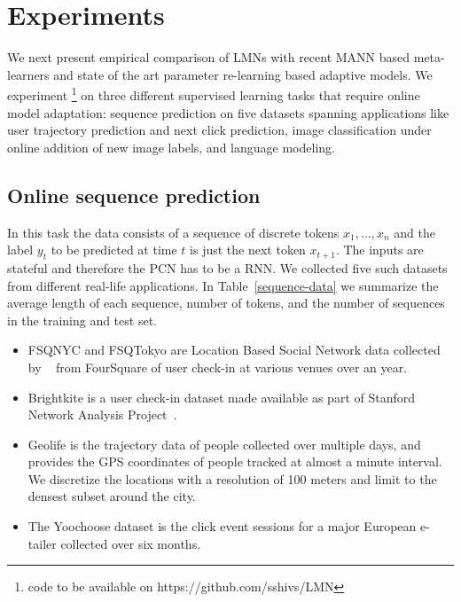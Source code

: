 \documentclass[letterpaper]{article} %
\begin{document}
\section{Experiments}
We next present empirical comparison of LMNs with recent MANN based meta-learners and state of the art parameter re-learning based adaptive models. We experiment \footnote{code to be available on https://github.com/sshivs/LMN} on three different supervised learning tasks that require online model adaptation: sequence prediction on five datasets spanning applications like user trajectory prediction and next click prediction,  image classification under online addition of new image labels, and language modeling.   
  

\subsection{Online sequence prediction}
\label{sec-expt-online}
In this task the data consists of a sequence of discrete tokens $x_1,\ldots,x_n$ and the label $y_t$ to be predicted at time $t$  is just the next token $x_{t+1}$.  The inputs are stateful and therefore the PCN has to be a RNN.
We collected five such datasets from different real-life applications. In Table~\ref{sequence-data} we summarize the average length of each sequence, number of tokens, and the number of sequences in the training and test set.  
\begin{itemize}
\item
FSQNYC and FSQTokyo are Location Based Social Network data collected by ~\cite{yang2014} from FourSquare of user check-in at various venues over an year.

\item Brightkite \cite{ChoMyLes11} is a user check-in dataset made available as part of Stanford Network Analysis Project~\cite{snapnets}.

\item
Geolife \cite{geolife09} is the trajectory data of people collected over multiple days, and provides the GPS coordinates of people tracked at almost a minute interval. We discretize the locations with a resolution of 100 meters and limit to the densest subset around the city.
\item
The Yoochoose dataset \cite{Ben-Shimon:2015:RCY:2792838.2798723} is the click event sessions for a major European e-tailer collected over six months. 

\end{itemize}
\end{document}
